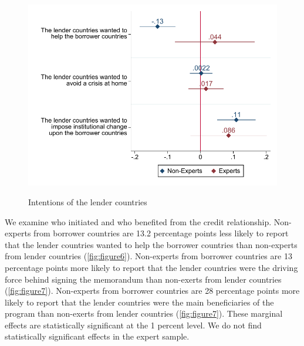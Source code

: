  \begin{figure}[H]
\begin{center}
     \caption{Intentions of the lender countries}
    
     \includegraphics[scale=0.8]{Question2_base.pdf}
     \label{fig:figure6}
      \end{center}
      \tiny
\end{figure}
We examine who initiated and who benefited from the credit relationship. 
Non-experts from borrower countries are 13.2 percentage points less likely to report that the lender countries wanted to help the borrower countries than non-experts from lender countries (\autoref{fig:figure6}). Non-experts from borrower countries are 13 percentage points more likely to report that the lender countries were the driving force behind signing the memorandum than non-exerts from lender countries (\autoref{fig:figure7}). Non-experts from borrower countries are 28 percentage points more likely to report that the lender countries were the main beneficiaries of the program than non-exerts from lender countries (\autoref{fig:figure7}). These marginal effects are statistically significant at the 1 percent level. We do not find statistically significant effects in the expert sample. \\
